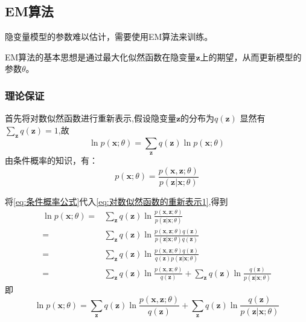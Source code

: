 \documentclass[withoutpreface,bwprint]{NoteBook}
\begin{document}
\subsection{EM算法}
隐变量模型的参数难以估计，需要使用EM算法来训练。

EM算法的基本思想是通过最大化似然函数在隐变量$\mathbf{z}$上的期望，从而更新模型的参数$\theta$。

\subsubsection{理论保证}

首先将对数似然函数进行重新表示,假设隐变量$\mathbf{z}$的分布为$q(\mathbf{z})$
显然有$\sum_{\mathbf{z}} q(\mathbf{z}) = 1$,故
\begin{equation}
    \label{eq:对数似然函数的重新表示1}
\ln p(\mathbf{x};\theta) 
= \sum_{\mathbf{z}} q(\mathbf{z}) \ln p(\mathbf{x};\theta) 
\end{equation}
由条件概率的知识，有：
\begin{equation}
    \label{eq:条件概率公式}
p(\mathbf{x};\theta) = \frac{p(\mathbf{x},\mathbf{z};\theta)}{ p(\mathbf{z}| \mathbf{x};\theta)} 
\end{equation}

将\cref{eq:条件概率公式}代入\cref{eq:对数似然函数的重新表示1},得到
\begin{align*}
\ln p(\mathbf{x};\theta) 
=& \sum_{\mathbf{z}} q(\mathbf{z}) \ln \frac{p(\mathbf{x},\mathbf{z};\theta)}{p(\mathbf{z}|\mathbf{x};\theta)} \nonumber \\
=& \sum_{\mathbf{z}} q(\mathbf{z}) \ln \frac{p(\mathbf{x},\mathbf{z};\theta) q(\mathbf{z})}{p(\mathbf{z}|\mathbf{x};\theta) q(\mathbf{z})} \nonumber \\
=& \sum_{\mathbf{z}} q(\mathbf{z}) \ln \frac{p(\mathbf{x},\mathbf{z};\theta) q(\mathbf{z})}{ q(\mathbf{z}) p(\mathbf{z}|\mathbf{x};\theta)} \nonumber \\
=& \sum_{\mathbf{z}} q(\mathbf{z}) \ln \frac{p(\mathbf{x},\mathbf{z};\theta)}{ q(\mathbf{z}) } + \sum_{\mathbf{z}} q(\mathbf{z}) \ln \frac{q(\mathbf{z})}{p(\mathbf{z}|\mathbf{x};\theta)}
\end{align*}
即
\begin{equation}
    \label{eq:对数似然函数的重新表示2}
\ln p(\mathbf{x};\theta) 
= \sum_{\mathbf{z}} q(\mathbf{z}) \ln \frac{p(\mathbf{x},\mathbf{z};\theta)}{ q(\mathbf{z}) } + \sum_{\mathbf{z}} q(\mathbf{z}) \ln \frac{q(\mathbf{z})}{p(\mathbf{z}|\mathbf{x};\theta)}
\end{equation}
\end{document}
